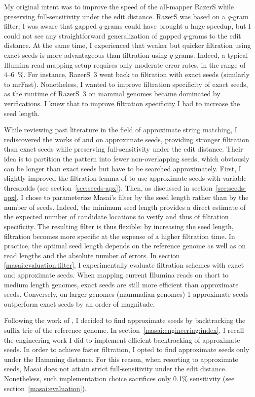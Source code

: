 My original intent was to improve the speed of the all-mapper RazerS \citep{Weese2009} while preserving full-sensitivity under the edit distance.
RazerS was based on a $q$-gram filter;
I was aware that gapped $q$-grams could have brought a huge speedup, but I could not see any straightforward generalization of gapped $q$-grams to the edit distance.
At the same time, I experienced that weaker but quicker filtration using exact seeds is more advantageous than filtration using $q$-grams.
Indeed, a typical Illumina read mapping setup requires only moderate error rates, in the range of 4--6~\%.
For instance, RazerS~3 \citep{Weese2012} went back to filtration with exact seeds (similarly to mrFast).
Nonetheless, I wanted to improve filtration specificity of exact seeds, as the runtime of RazerS~3 on mammal genomes became dominated by verifications.
I knew that to improve filtration specificity I had to increase the seed length.

While reviewing past literature in the field of approximate string matching, I rediscovered the works of \cite{Myers1994} and \cite{Navarro2000} on approximate seeds, providing stronger filtration than exact seeds while preserving full-sensitivity under the edit distance.
Their idea is to partition the pattern into fewer non-overlapping seeds, which obviously can be longer than exact seeds but have to be searched approximately.
First, I slightly improved the filtration lemma of \citep{Navarro2000} to use approximate seeds with variable thresholds (see section~\ref{sec:seeds-apx}).
Then, as discussed in section~\ref{sec:seeds-apx}, I chose to parameterize Masai's filter by the seed length rather than by the number of seeds.
Indeed, the minimum seed length provides a direct estimate of the expected number of candidate locations to verify and thus of filtration specificity.
The resulting filter is thus flexible: by increasing the seed length, filtration becomes more specific at the expense of a higher filtration time.
In practice, the optimal seed length depends on the reference genome as well as on read lengths and the absolute number of errors.
In section \ref{masai:evaluation:filter}, I experimentally evaluate filtration schemes with exact and approximate seeds.
When mapping current Illumina reads on short to medium length genomes, exact seeds are still more efficient than approximate seeds.
Conversely, on larger genomes (\eg mammalian genomes) 1-approximate seeds outperform exact seeds by an order of magnitude.

Following the work of \cite{Navarro2000}, I decided to find approximate seeds by backtracking the suffix trie of the reference genome.
In section~\ref{masai:engineering:index}, I recall the engineering work I did to implement efficient backtracking of approximate seeds.
In order to achieve faster filtration, I opted to find approximate seeds only under the Hamming distance.
For this reason, when resorting to approximate seeds, Masai does not attain strict full-sensitivity under the edit distance.
Nonetheless, such implementation choice sacrifices only 0.1\% sensitivity (see section~\ref{masai:evaluation}).

